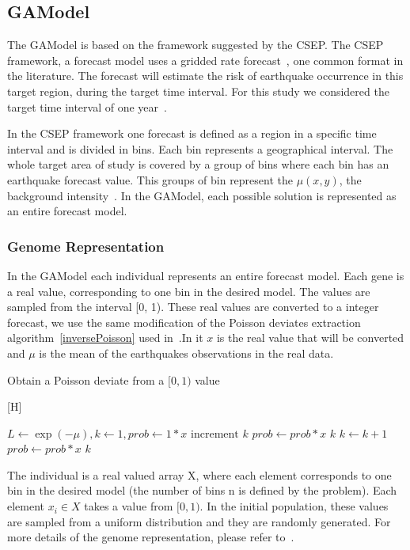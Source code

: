 \subsection{GAModel}\label{GAModel}
The GAModel is based on the framework suggested by the CSEP. The CSEP framework, a forecast model uses a gridded rate
forecast~\cite{zechar2010evaluating}, one common format in the
literature. The forecast will estimate the risk of earthquake occurrence in this target region, during the target time interval. For this study we considered the target time interval of one year~\cite{ecta14}.

 In the CSEP framework one forecast is defined as a region in a specific time interval and is divided in bins. Each bin represents a geographical interval. The whole target area of study is covered by a group of bins where each bin has an earthquake forecast value. This groups of bin represent the $\mu(x,y)$, the background intensity~\cite{zhuang2004analyzing}. In the GAModel, each possible solution is represented as an entire forecast model.

\subsubsection{Genome Representation}\label{genomeGA}
In the GAModel each individual represents an entire forecast model. Each gene is a real value, corresponding to one bin in the desired model. The values are sampled from the interval [0, 1). These real values are converted to a integer forecast, we use the same modification of the Poisson deviates extraction algorithm~\ref{inversePoisson} used in~\cite{ecta14}.In it $x$ is the real value that will be converted and $\mu$ is the mean of the earthquakes observations in the real data.

\begin{algorithm}\label{inversePoisson}
	\caption{Obtain a Poisson deviate from a $[0,1)$ value}
	\label{InversePoisson}[H]
	\begin{algorithmic}
		\STATE $L \gets \exp{(-\mu)}, k \gets 1, prob \gets 1 * x$
		\REPEAT 
		\STATE $\text{increment }k$
		\STATE $prob \gets prob*x$
		\RETURN $k$
		\STATE $k \gets k + 1$
		\STATE $prob \gets prob*x$
		\ENDWHILE
		\RETURN $k$
	\end{algorithmic}
\end{algorithm}

The individual is a real valued array X, where each element corresponds to one bin in the desired model (the number of bins n is defined by the problem). Each element $x_i \in X$ takes a value from $[0,1)$. In the initial population, these values are sampled from a uniform distribution and they are randomly generated. For more details of the genome representation, please refer to~\cite{ecta14}.

